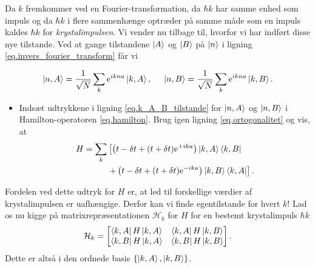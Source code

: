 \documentclass[11pt, a4paper]{article}
\def\te{{\rm e}}
\begin{document}
Da $k$ fremkommer ved en Fourier-transformation, da $\hbar k$ har samme enhed som impuls og da $\hbar k$ i flere sammenhænge optræder på samme måde som en impuls kaldes $\hbar k$ for \textit{krystalimpulsen}. Vi vender nu tilbage til, hvorfor vi har indført disse nye tilstande. Ved at gange tilstandene $\ket{A}$ og $\ket{B}$ på $\ket{n}$ i ligning \eqref{eq.invers_fourier_transform} får vi

\begin{equation}
\ket{n, A} = \frac{1}{\sqrt{N}}\sum_{k} \te^{ik na} \ket{k, A}, \hspace{0.5cm} \ket{n, B} = \frac{1}{\sqrt{N}}\sum_{k} \te^{ik na} \ket{k, B}. 
\label{eq.k_A_B_tilstande}
\end{equation}

\begin{itemize}
	\item Indsæt udtrykkene i ligning \eqref{eq.k_A_B_tilstande} for $\ket{n, A}$ og $\ket{n, B}$ i Hamilton-operatoren \eqref{eq.hamilton}. Brug igen ligning \eqref{eq.ortogonalitet} og vis, at
	\begin{align}
	H = \sum_k &\left[ \left(t - \delta t + (t + \delta t)\te^{+ika}\right) \ket{k, A}\bra{k, B} \right. \nonumber \\
	& \left. + \left(t - \delta t + (t + \delta t)\te^{-ika}\right) \ket{k, B}\bra{k, A} \right].
	\label{eq.hamilton_krum}
	\end{align}
\end{itemize}

Fordelen ved dette udtryk for $H$ er, at led til forskellige værdier af krystalimpulsen er uafhængige. Derfor kan vi finde egentilstande for hvert $k$! Lad os nu kigge på matrixrepræsentationen $\mathcal{H}_k$ for $H$ for en bestemt krystalimpuls $\hbar k$
\begin{equation}
\mathcal{H}_k = \begin{bmatrix} \bra{k, A} H \ket{k, A} & \bra{k, A} H \ket{k, B} \\ \bra{k, B} H \ket{k, A} & \bra{k, B} H \ket{k, B} \end{bmatrix}.
\end{equation}
Dette er altså i den ordnede basis $\{\ket{k, A}, \ket{k, B}\}$.
\end{document}
